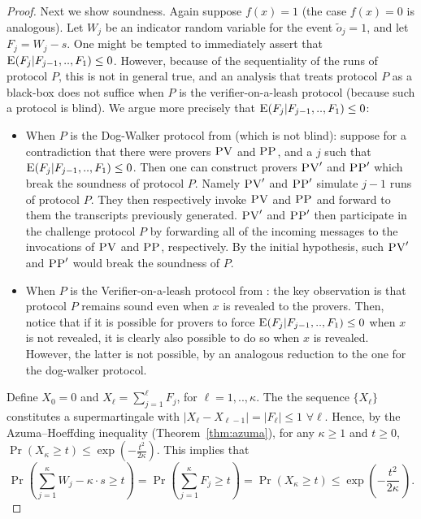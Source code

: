 \documentclass{toc}
\newcommand{\pv}{\textsc{PV}}
\newcommand{\pp}{\textsc{PP}}
\begin{document}
\begin{proof}
Next we show soundness.
Again suppose $f(x) = 1$ (the case $f(x) = 0$ is analogous). Let $W_j$ be an indicator random variable for the event $\tilde{o}_j = 1$, and let $F_j = W_j - s$. One might be tempted to immediately assert that $\textsc{E}(F_j|F_{j-1},..,F_1) \leq 0$. However, because of the sequentiality of the runs of protocol $P$, this is not in general true, and an analysis that treats protocol $P$ as a black-box does not suffice when $P$ is the verifier-on-a-leash protocol (because such a protocol is blind). We argue more precisely that $\textsc{E}(F_j|F_{j-1},..,F_1) \leq 0$:
\begin{itemize}
    \item When $P$ is the Dog-Walker protocol from  (which is not blind): suppose for a contradiction that there were provers $\pv$ and $\pp$, and a $j$ such that $\textsc{E}(F_j|F_{j-1},..,F_1) \leq 0$. Then one can construct provers $\pv'$ and $\pp'$ which break the soundness of protocol $P$. Namely $\pv'$ and $\pp'$ simulate $j-1$ runs of protocol $P$. They then respectively invoke $\pv$ and $\pp$ and forward to them the transcripts previously generated. $\pv'$ and $\pp'$ then participate in the challenge protocol $P$ by forwarding all of the incoming messages to the invocations of $\pv$ and $\pp$, respectively. %
By the initial hypothesis, such $\pv'$ and $\pp'$ would break the soundness of $P$.
    \item When $P$ is the Verifier-on-a-leash protocol from : the key observation is that protocol $P$ remains sound even when $x$ is revealed to the provers. Then, notice that if it is possible for provers to force $\textsc{E}(F_j|F_{j-1},..,F_1) \leq 0$ when $x$ is not revealed, it is clearly also possible to do so when $x$ is revealed. However, the latter is not possible, by an analogous reduction to the one for the dog-walker protocol. 
\end{itemize}
Define $X_0=0$ and $X_\ell = \sum_{j=1}^\ell F_j$, for $\ell=1,..,\kappa$. The
%
the sequence $\{X_\ell\}$ constitutes   %
a supermartingale with $|X_\ell-X_{\ell-1}| = |F_\ell| \leq 1 \,\, \forall \ell$.  Hence,%
by the Azuma--Hoeffding inequality   %
(Theorem~\ref{thm:azuma}),
%
for any $\kappa\geq 1$ and $t\geq 0$, $\Pr(X_\kappa \geq t) \leq \exp(-\frac{t^2}{2\kappa})$. This implies that 
\begin{equation*}
\Pr \left(\sum_{j=1}^{\kappa} W_j - \kappa \cdot s \geq t \right) = \Pr \left(\sum_{j=1}^{\kappa}F_j \geq t \right) = \Pr \left(X_{\kappa} \geq t \right) \leq \exp\left(-\frac{t^2}{2\kappa}\, \right).

\end{equation*}
\end{proof}
\end{document}
